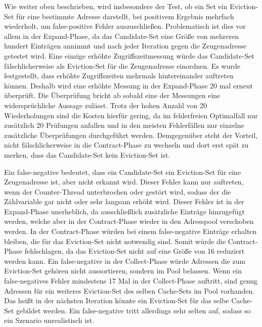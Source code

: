 Wie weiter oben beschrieben, wird insbesondere der Test, ob ein Set ein Eviction-Set für eine bestimmte Adresse darstellt, bei positivem Ergebnis mehrfach wiederholt, um false-positive Fehler auszuschließen. 
Problematisch ist dies vor allem in der Expand-Phase, da das Candidate-Set eine Größe von mehreren hundert Einträgen annimmt und nach jeder Iteration gegen die Zeugenadresse getestet wird. 
Eine einzige erhöhte Zugriffszeitmessung würde das Candidate-Set fälschlicherweise als Eviction-Set für die Zeugenadresse einordnen. 
Es wurde festgestellt, dass erhöhte Zugriffszeiten mehrmals hintereinander auftreten können. Deshalb wird eine erhöhte Messung in der Expand-Phase 20 mal erneut überprüft. 
Die Überprüfung bricht ab sobald eine der Messungen eine widersprüchliche Aussage zulässt.
Trotz der hohen Anzahl von 20 Wiederholungen sind die Kosten hierfür gering, da im fehlerfreien Optimalfall nur zusätzlich 20 Prüfungen anfallen und in den meisten Fehlerfällen nur einzelne zusätzliche Überprüfungen durchgeführt werden. 
Demgegenüber steht der Vorteil, nicht fälschlicherweise in die Contract-Phase zu wechseln und dort erst spät zu merken, dass das Candidate-Set kein Eviction-Set ist.

Ein false-negative bedeutet, dass ein Candidate-Set ein Eviction-Set für eine Zeugenadresse ist, aber nicht erkannt wird.
Dieser Fehler kann nur auftreten, wenn der Counter-Thread unterbrochen oder gestört wird, sodass der die Zählvariable gar nicht oder sehr langsam erhöht wird.
Dieser Fehler ist in der Expand-Phase unerheblich, da ausschließlich zusätzliche Einträge hinzugefügt werden, welche aber in der Contract-Phase wieder in den Adresspool verschoben werden.
In der Contract-Phase würden bei einem false-negative Einträge erhalten bleiben, die für das Eviction-Set nicht notwendig sind. Somit würde die Contract-Phase fehlschlagen, da das Eviction-Set nicht auf eine Größe von 16 reduziert werden kann.
Ein false-negative in der Collect-Phase würde Adressen die zum Eviction-Set gehören nicht aussortieren, sondern im Pool belassen.
Wenn ein false-negatives Fehler mindestens 17 Mal in der Collect-Phase auftritt, sind genug Adressen für ein weiteres Eviction-Set des selben Cache-Sets im Pool vorhanden. Das heißt in der nächsten Iteration könnte ein Eviction-Set für das selbe Cache-Set gebildet werden.
Ein false-negative tritt allerdings sehr selten auf, sodass so ein Szenario unrealistisch ist.


